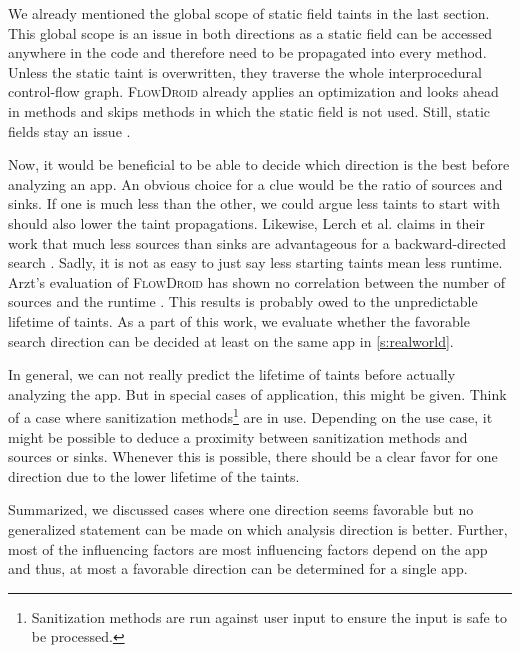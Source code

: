 \documentclass[../draft.tex]{subfiles}
\begin{document}
    We already mentioned the global scope of static field taints in the last section. This global scope is an issue in both directions as a static field can be accessed anywhere in the code and therefore need to be propagated into every method. Unless the static taint is overwritten, they traverse the whole interprocedural control-flow graph. \textsc{FlowDroid} already applies an optimization and looks ahead in methods and skips methods in which the static field is not used. Still, static fields stay an issue \cite{Arzt2017PhD}.

    Now, it would be beneficial to be able to decide which direction is the best before analyzing an app. An obvious choice for a clue would be the ratio of sources and sinks. If one is much less than the other, we could argue less taints to start with should also lower the taint propagations. 
    Likewise, Lerch et al. claims in their work that much less sources than sinks are advantageous for a backward-directed search \cite{Lerch2014}. 
    Sadly, it is not as easy to just say less starting taints mean less runtime. Arzt's evaluation of \textsc{FlowDroid} has shown no correlation between the number of sources and the runtime \cite{Arzt2017PhD}. This results is probably owed to the unpredictable lifetime of taints.
    As a part of this work, we evaluate whether the favorable search direction can be decided at least on the same app in \autoref{s:realworld}.

    In general, we can not really predict the lifetime of taints before actually analyzing the app. But in special cases of application, this might be given. Think of a case where sanitization methods\footnote{Sanitization methods are run against user input to ensure the input is safe to be processed.} are in use. Depending on the use case, it might be possible to deduce a proximity between sanitization methods and sources or sinks. Whenever this is possible, there should be a clear favor for one direction due to the lower lifetime of the taints. 

    Summarized, we discussed cases where one direction seems favorable but no generalized statement can be made on which analysis direction is better. Further, most of the influencing factors are most influencing factors depend on the app and thus, at most a favorable direction can be determined for a single app.
\end{document}
